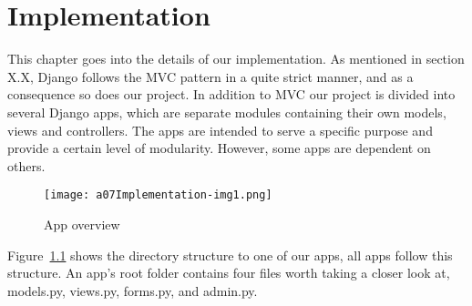 \chapter{Implementation}

This chapter goes into the details of our implementation. As mentioned
in section X.X, Django follows the MVC pattern in a quite strict
manner, and as a consequence so does our project. In addition to MVC
our project is divided into several Django apps, which are separate
modules containing their own models, views and controllers. The apps
are intended to serve a specific purpose and provide a certain level of
modularity. However, some apps are dependent on others.


\bigskip

\begin{figure}
	\texttt{[image: a07Implementation-img1.png]}
	\caption{App overview}
	\label{fig:appOverview}
\end{figure}


\bigskip

Figure~\ref{fig:appOverview} shows the directory structure to one of our apps, all apps
follow this structure. An app{\textquoteright}s root folder contains
four files worth taking a closer look at, models.py, views.py,
forms.py, and admin.py. 


\bigskip


